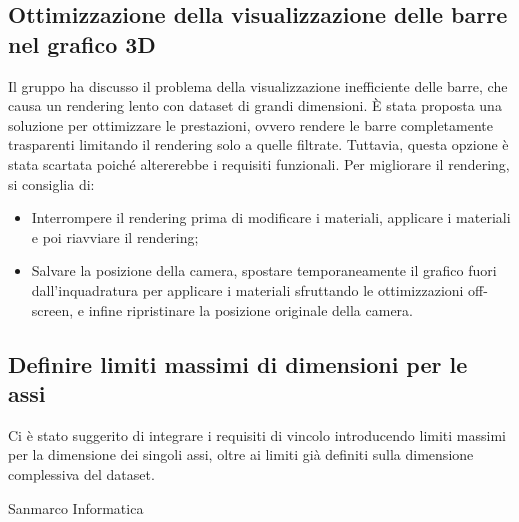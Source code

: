 \subsection{Ottimizzazione della visualizzazione delle barre nel grafico 3D}
Il gruppo ha discusso il problema della visualizzazione inefficiente delle barre, che causa un rendering lento con dataset di grandi dimensioni. È stata proposta una soluzione per ottimizzare le prestazioni, ovvero rendere le barre completamente trasparenti limitando il rendering solo a quelle filtrate. Tuttavia, questa opzione è stata scartata poiché altererebbe i requisiti funzionali.
Per migliorare il rendering, si consiglia di:
\begin{itemize}
\item Interrompere il rendering prima di modificare i materiali, applicare i materiali e poi riavviare il rendering;
\item Salvare la posizione della camera, spostare temporaneamente il grafico fuori dall'inquadratura per applicare i materiali sfruttando le ottimizzazioni off-screen, e infine ripristinare la posizione originale della camera.
\end{itemize}
\subsection{Definire limiti massimi di dimensioni per le assi}
Ci è stato suggerito di integrare i requisiti di vincolo introducendo limiti massimi per la dimensione dei singoli assi, oltre ai limiti già definiti sulla dimensione complessiva del dataset.

\hfill\signature{Approvazione esterna}{Sanmarco Informatica}
